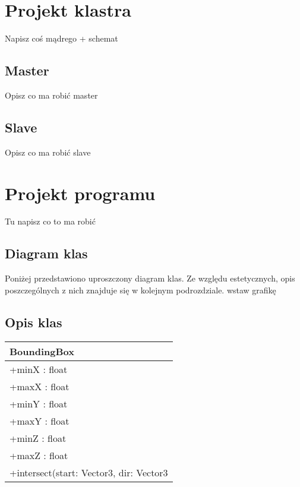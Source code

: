 \section{Projekt klastra}

	Napisz coś mądrego + schemat
	
	\subsection{Master} Opisz co ma robić master
	\subsection{Slave} Opisz co ma robić slave
\section{Projekt programu}

	Tu napisz co to ma robić
	
	\subsection{Diagram klas}
	
	Poniżej przedstawiono uproszczony diagram klas. Ze względu estetycznych, opis poszczególnych z nich znajduje się w kolejnym podrozdziale. wstaw grafikę
	
	
	\subsection{Opis klas}


\begin{center}
    \begin{tabular}{|l|}
    \hline
    BoundingBox \\ \hline
    +minX : float \\
    +maxX : float \\
    +minY : float \\
    +maxY : float \\
    +minZ : float \\
    +maxZ : float \\ 
    \hline
	+intersect(start: Vector3, dir: Vector3 \\ 
	\hline
    \end{tabular}
\end{center}


